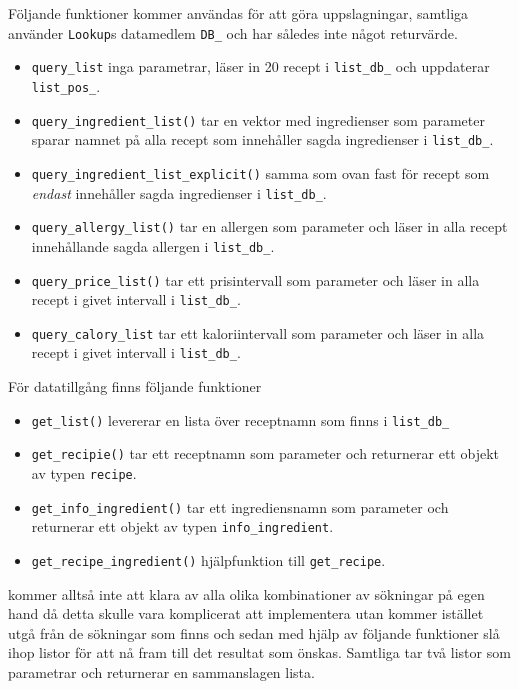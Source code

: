Följande funktioner kommer användas för att göra uppslagningar,
samtliga använder \verb+Lookup+s datamedlem \verb+DB_+ och har således 
inte något returvärde. 

  \begin{itemize}
    \item   \verb+query_list+ inga parametrar, läser in 20 recept i \verb+list_db_+ och uppdaterar \verb+list_pos_+.
    \item   \verb+query_ingredient_list()+ tar en vektor med ingredienser som parameter sparar namnet på alla recept som innehåller sagda ingredienser i \verb+list_db_+.
    \item   \verb+query_ingredient_list_explicit()+ samma som ovan fast för recept som \emph{endast} innehåller sagda ingredienser i \verb+list_db_+.
    \item   \verb+query_allergy_list()+ tar en allergen som parameter och läser in alla recept innehållande sagda allergen i \verb+list_db_+.
    \item   \verb+query_price_list()+ tar ett prisintervall som parameter och läser in alla recept i givet intervall i \verb+list_db_+.
    \item   \verb+query_calory_list+ tar ett kaloriintervall som parameter och läser in alla recept i givet intervall i \verb+list_db_+.
  \end{itemize}
 

För datatillgång finns följande funktioner

\begin{itemize}
\item   \verb+get_list()+ levererar en lista över receptnamn som finns i \verb+list_db_+
\item   \verb+get_recipie()+ tar ett receptnamn som parameter och returnerar ett objekt av typen \verb+recipe+.
\item   \verb+get_info_ingredient()+ tar ett ingrediensnamn som parameter och returnerar ett objekt av typen \verb+info_ingredient+.
\item   \verb+get_recipe_ingredient()+ hjälpfunktion till \verb+get_recipe+.
\end{itemize}

\Lookup kommer alltså inte att klara av alla olika kombinationer av sökningar på egen hand då detta skulle vara komplicerat att implementera utan kommer istället utgå från de sökningar som finns och sedan med hjälp av följande funktioner slå ihop listor för att nå fram till det resultat som önskas. Samtliga tar två listor som parametrar och returnerar en sammanslagen lista.

